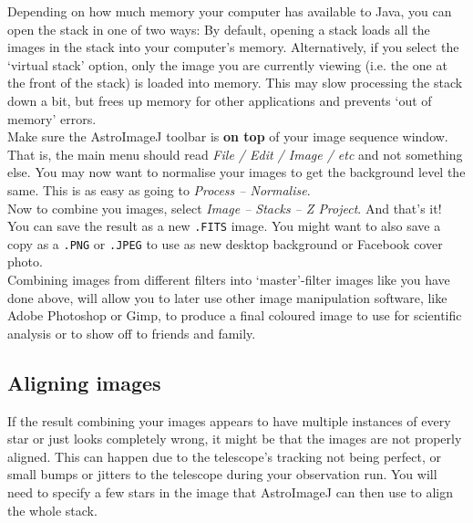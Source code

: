 \documentclass[12pt,twoside,a4paper]{report}
\begin{document}
Depending on how much memory your computer has available to Java, you can open the stack in one of two ways: By default, opening a stack loads all the images in the stack into your computer's memory. Alternatively, if you select the `virtual stack' option, only the image you are currently viewing (i.e. the one at the front of the stack) is loaded into memory. This may slow processing the stack down a bit, but frees up memory for other applications and prevents `out of memory' errors.\\

Make sure the AstroImageJ toolbar is \textbf{on top} of your image sequence window. That is, the main menu should read \emph{File / Edit / Image / etc} and not something else. You may now want to normalise your images to get the background level the same. This is as easy as going to \emph{Process -- Normalise}.\\ 

Now to combine you images, select \emph{Image -- Stacks -- Z Project}. And that's it! You can save the result as a new {\tt .FITS} image. You might want to also save a copy as a {\tt .PNG} or {\tt .JPEG} to use as new desktop background or Facebook cover photo.\\

Combining images from different filters into `master'-filter images like you have done above, will allow you to later use other image manipulation software, like Adobe Photoshop or Gimp, to produce a final coloured image to use for scientific analysis or to show off to friends and family.

\subsection{Aligning images}

If the result combining your images appears to have multiple instances of every star or just looks completely wrong, it might be that the images are not properly aligned. This can happen due to the telescope's tracking not being perfect, or small bumps or jitters to the telescope during your observation run. You will need to specify a few stars in the image that AstroImageJ can then use to align the whole stack.\\
\end{document}
